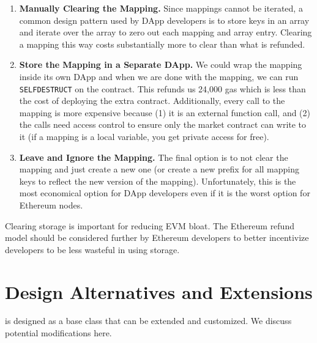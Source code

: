 \begin{enumerate}

\item \textbf{Manually Clearing the Mapping.} Since mappings cannot be iterated, a common design pattern used by DApp developers is to store keys in an array and iterate over the array to zero out each mapping and array entry. Clearing a mapping this way costs substantially more to clear than what is refunded.

\item \textbf{Store the Mapping in a Separate DApp.} We could wrap the mapping inside its own DApp and when we are done with the mapping, we can run \texttt{SELFDESTRUCT} on the contract. This refunds us 24,000 gas which is less than the cost of deploying the extra contract. Additionally, every call to the mapping is more expensive because (1) it is an external function call, and (2) the calls need access control to ensure only the market contract can write to it (if a mapping is a local variable, you get private access for free). 

\item \textbf{Leave and Ignore the Mapping.} The final option is to not clear the mapping and just create a new one (or create a new prefix for all mapping keys to reflect the new version of the mapping). Unfortunately, this is the most economical option for DApp developers even if it is the worst option for Ethereum nodes. 

\end{enumerate}

Clearing storage is important for reducing EVM bloat. The Ethereum refund model should be considered further by Ethereum developers to better incentivize developers to be less wasteful in using storage. 


\section{Design Alternatives and Extensions}


\cm is designed as a base class that can be extended and customized. We discuss potential modifications here.  

